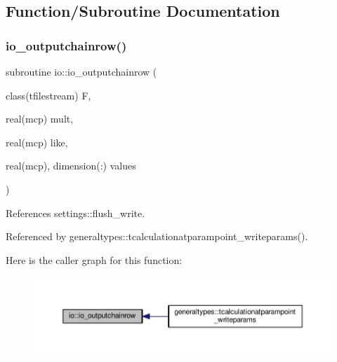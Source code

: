 \subsection{Function/\+Subroutine Documentation}
\mbox{\label{namespaceio_a304998b946633408764eeaf9b32b5687}} 
\subsubsection{\texorpdfstring{io\+\_\+outputchainrow()}{io\_outputchainrow()}}
{\footnotesize\ttfamily subroutine io\+::io\+\_\+outputchainrow (\begin{DoxyParamCaption}\item[{class(tfilestream)}]{F,  }\item[{real(mcp)}]{mult,  }\item[{real(mcp)}]{like,  }\item[{real(mcp), dimension(\+:)}]{values }\end{DoxyParamCaption})}



References settings\+::flush\+\_\+write.



Referenced by generaltypes\+::tcalculationatparampoint\+\_\+writeparams().

Here is the caller graph for this function\+:
\nopagebreak
\begin{figure}[H]
\begin{center}
\leavevmode
\includegraphics[width=350pt]{namespaceio_a304998b946633408764eeaf9b32b5687_icgraph}
\end{center}
\end{figure}
\mbox{\label{namespaceio_a4e9e0bbb9fe4d25b43fe615489cdf0a2}} 
